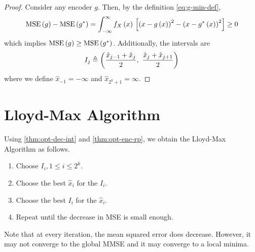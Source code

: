 \documentclass[twoside]{article}
\begin{document}
\begin{proof}
    Consider any encoder \(g\). Then, by the definition \eqref{eq:g-min-def},
    \begin{equation}
        \mathrm{MSE}\left(g\right) - \mathrm{MSE}\left(g^{*}\right) = \int_{-\infty}^{\infty}f_X\left(x\right){}\left[\left(x-g\left(x\right)\right)^2 - \left(x-g^{*}\left(x\right)\right)^2\right] \ge 0
    \end{equation}
    which implies \(\mathrm{MSE}\left(g\right) \ge \mathrm{MSE}\left(g^{*}\right)\). Additionally, the intervals are
    \begin{equation}
        I_j \triangleq \brak{\frac{\hat{x}_{j-1}+\hat{x}_j}{2},\ \frac{\hat{x}_j+\hat{x}_{j+1}}{2}}
        \label{eq:I-j-def}
    \end{equation}
    where we define \(\hat{x}_{-1} = -\infty\) and \(\hat{x}_{2^k+1} = \infty\).
\end{proof}

\section{Lloyd-Max Algorithm}

Using \autoref{thm:opt-dec-int} and \autoref{thm:opt-enc-rp}, we obtain the Lloyd-Max Algorithm as follows.

\begin{enumerate}
    \item Choose \(I_i, 1 \le i \le 2^k\).
    \item Choose the best \(\hat{x}_i\) for the \(I_i\).
    \item Choose the best \(I_i\) for the \(\hat{x}_i\).
    \item Repeat until the decrease in MSE is small enough.
\end{enumerate}

Note that at every iteration, the mean squared error does decrease. However, it may not converge to the global MMSE and it may converge to a local minima.
\end{document}
